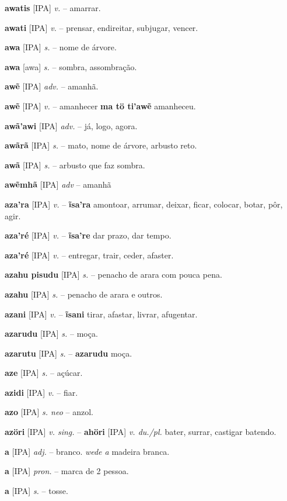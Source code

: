 \textbf{awatis} [IPA] \textit{v.} -- amarrar.

\textbf{awati} [IPA] \textit{v.} -- prensar, endireitar, subjugar, vencer.

\textbf{awa} [IPA] \textit{s.} -- nome de árvore.

\textbf{awa} [awa] \textit{s.} -- sombra, assombração.

\textbf{awẽ} [IPA] \textit{adv.} -- amanhã.

\textbf{awẽ} [IPA] \textit{v.} -- amanhecer  \textbf{ma tö ti'awẽ} amanheceu.

\textbf{awã'awi} [IPA] \textit{adv.} -- já, logo, agora.

\textbf{awãrã} [IPA] \textit{s.} -- mato, nome de árvore, arbusto reto.

\textbf{awã} [IPA] \textit{s.} -- arbusto que faz sombra.

\textbf{awẽmhã} [IPA] \textit{adv} -- {amanhã}

\textbf{aza'ra} [IPA] \textit{v.} -- \textbf{ĩsa'ra} amontoar, arrumar, deixar, ficar, colocar, botar, pôr, agir.

\textbf{aza'ré} [IPA] \textit{v.} -- \textbf{ĩsa're} dar prazo, dar tempo.

\textbf{aza'ré} [IPA] \textit{v.} -- entregar, trair, ceder, afaster.

\textbf{azahu pisudu} [IPA] \textit{s.} -- penacho de arara com pouca pena.

\textbf{azahu} [IPA] \textit{s.} -- penacho de arara e outros.

\textbf{azani} [IPA] \textit{v.} -- \textbf{ĩsani} tirar, afastar, livrar, afugentar.

\textbf{azarudu} [IPA] \textit{s.} -- moça.

\textbf{azarutu} [IPA] \textit{s.} -- \textbf{azarudu} moça.

\textbf{aze} [IPA] \textit{s.} -- açúcar.

\textbf{azidi} [IPA] \textit{v.} -- fiar.

\textbf{azo} [IPA] \textit{s. neo} -- anzol.

\textbf{azöri} [IPA] \textit{v. sing.} -- \textbf{ahöri} [IPA] \textit{v. du./pl.} bater, surrar, castigar batendo.

\textbf{a} [IPA] \textit{adj.} -- branco.  \textit{wede a} madeira branca.

\textbf{a} [IPA] \textit{pron.} -- marca de 2 pessoa.

\textbf{a} [IPA] \textit{s.} -- tosse.

